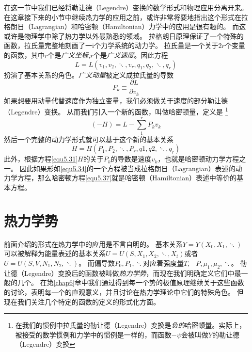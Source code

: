 在这一节中我们已经将勒让德（Legendre）变换的数学形式和物理应用分离开来。
在这章接下来的小节中继续热力学的应用之前，或许非常将要地指出这个形式在拉格朗日（Lagrangian）和哈密顿（Hamiltonian）力学中的应用是很有趣的。
而这或许是物理学中除了热力学以外最熟悉的领域。
拉格朗日原理保证了一个特殊的函数，拉氏量完整地刻画了一i个力学系统的动力学。
拉氏量是一个关于$2r$个变量的函数，其中$r$个是{\it 广义坐标},$r$个是{\it 广义速度}。因此方程
\begin{equation}
\label{equ5.34}
  L=L(v_1,v_2,\ddots,v_r,q_1,q_2,\ddots,q_r)
\end{equation}
扮演了基本关系的角色。{\it 广义动量}被定义成拉氏量的导数
\begin{equation}
\label{equ5.35}
	P_k \equiv \frac{\partial L}{\partial v_k}
\end{equation}
如果想要用动量代替速度作为独立变量，我们必须做关于速度的部分勒让德（Legendre）变换。
从而我们引入一个新的函数，叫做哈密顿量，定义是
\footnote{在我们的惯例中拉氏量的勒让德（Legendre）变换是{\it 负的}哈密顿量。实际上，被接受的数学惯例和力学中的惯例是一样的，而函数$-\psi$会被叫做$Y$的勒让德（Legendre）变换}
\begin{equation}
\label{equ5.36}
  (-H)=L-\sum_1^rP_kv_k
\end{equation}
然后一个完整的动力学形式就可以基于这个新的基本关系
\begin{equation}
\label{equ5.37}
  H=H(P_1,P_2,\ddots,P_r,q1,q2,\ddots,q_r)
\end{equation}
此外，根据方程\eqref{equ5.31}$H$的关于$P_k$的导数是速度$v_k$，也就是哈密顿动力学方程之一。
因此如果形如\eqref{equ5.34}的一个方程被当成拉格朗日（Lagrangian）表述的动力学方程，那么哈密顿方程\eqref{equ5.37}就是哈密顿（Hamiltonian）表述中等价的基本方程。



\section{热力学势}
\label{sec5.3}

前面介绍的形式在热力学中的应用是不言自明的。
基本关系$Y=Y(X_0,X_1,\ddots)$可以被解释为能量表述的基本关系$U=U(S,X_1,X_2,\ddots,X_t)$或者$U=U(S,V,N_1,N_2,\ddots)$。
而偏导数$P_0,P_1,\ddots$对应着强度量$T,-P,\mu_1,\mu_2,\ddots$。
勒让德（Legendre）变换后的函数被叫做{\it 热力学势}，而现在我们明确定义它们中最一般的几个。
在第\ref{chap6}章中我们通过得到每一个势的极值原理继续关于这些函数的讨论，表明每一个的直观意义，并且讨论在热力学理论中它们的特殊角色。
但现在我们关注几个特定的函数的定义的形式化方面。

